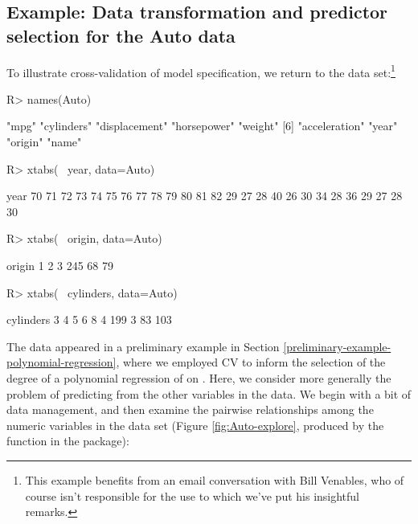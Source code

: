 \documentclass[
]{jss}
\begin{document}
\subsection{Example: Data transformation and predictor selection for the
Auto
data}\label{example-data-transformation-and-predictor-selection-for-the-auto-data}

To illustrate cross-validation of model specification, we return to the
 data set:\footnote{This example benefits from an email
  conversation with Bill Venables, who of course isn't responsible for
  the use to which we've put his insightful remarks.}

\begin{CodeChunk}
\begin{CodeInput}
R> names(Auto)
\end{CodeInput}
\begin{CodeOutput}
[1] "mpg"          "cylinders"    "displacement" "horsepower"   "weight"      
[6] "acceleration" "year"         "origin"       "name"        
\end{CodeOutput}
\begin{CodeInput}
R> xtabs(~ year, data=Auto)
\end{CodeInput}
\begin{CodeOutput}
year
70 71 72 73 74 75 76 77 78 79 80 81 82 
29 27 28 40 26 30 34 28 36 29 27 28 30 
\end{CodeOutput}
\begin{CodeInput}
R> xtabs(~ origin, data=Auto)
\end{CodeInput}
\begin{CodeOutput}
origin
  1   2   3 
245  68  79 
\end{CodeOutput}
\begin{CodeInput}
R> xtabs(~ cylinders, data=Auto)
\end{CodeInput}
\begin{CodeOutput}
cylinders
  3   4   5   6   8 
  4 199   3  83 103 
\end{CodeOutput}
\end{CodeChunk}

The  data appeared in a preliminary example in Section
\ref{preliminary-example-polynomial-regression}, where we employed CV to
inform the selection of the degree of a polynomial regression of
 on . Here, we consider more generally the
problem of predicting  from the other variables in the
 data. We begin with a bit of data management, and then
examine the pairwise relationships among the numeric variables in the
data set (Figure \ref{fig:Auto-explore}, produced by the
 function in the  package):
\end{document}
